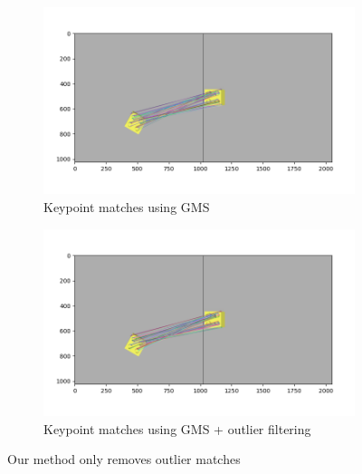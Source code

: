 \begin{figure}[H]
    \centering
    \begin{subfigure}[t]{0.49\textwidth}
        \includegraphics[width=\textwidth]{figures/inliers-gms.png}
        \caption{Keypoint matches using GMS}
        \label{fig:inliers-gms}
    \end{subfigure}
    \hfill
    \begin{subfigure}[t]{0.49\textwidth}
        \includegraphics[width=\textwidth]{figures/inliers-gms+ours.png}
        \caption{Keypoint matches using GMS + outlier filtering}
        \label{fig:inliers-gms+filter}
    \end{subfigure}
    \caption{Our method only removes outlier matches}
    \label{fig:consensus-filtering2}
\end{figure}


